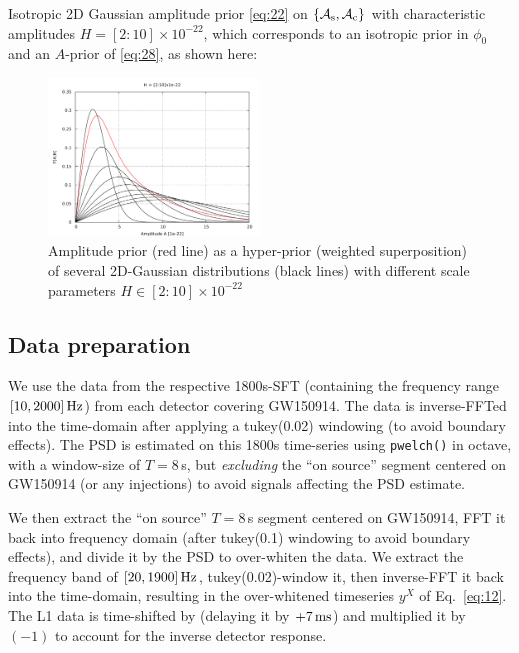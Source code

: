 \documentclass[aps,prd,onecolumn,notitlepage,nofootinbib,superscriptaddress,altaffilletter,floatfix]{revtex4-1}
\begin{document}
Isotropic 2D Gaussian amplitude prior \eqref{eq:22} on $\{{\mathcal A}_{\mathrm{s}},{\mathcal A}_{\mathrm{c}}\}$ with characteristic amplitudes $H = [2 : 10]\times10^{-22}$, which corresponds to
an isotropic prior in $\phi_0$ and an $A$-prior of \eqref{eq:28}, as shown here:
\begin{figure}[htbp]
  \centering
  \includegraphics[width=0.5\textwidth]{prior_A.pdf}
  \caption{Amplitude prior (red line) as a hyper-prior (weighted superposition) of several 2D-Gaussian distributions (black lines) with different
    scale parameters $H\in{[2:10]}\times10^{-22}$}
  \label{fig:AmpPrior}
\end{figure}

\subsection{Data preparation}
\label{sec:data-preparation}

We use the data from the respective 1800s-SFT (containing the frequency range $[10,2000]\,\mathrm{Hz}$) from each detector covering GW150914.
The data is inverse-FFTed into the time-domain after applying a tukey(0.02) windowing (to avoid boundary effects).
The PSD is estimated on this 1800s time-series using \texttt{pwelch()} in octave, with a window-size of $T=8\,$s, but \emph{excluding} the
``on source'' segment centered on GW150914 (or any injections) to avoid signals affecting the PSD estimate.

We then extract the ``on source'' $T=8\,$s segment centered on GW150914, FFT it back into frequency domain (after tukey(0.1) windowing to avoid
boundary effects),  and divide it by the PSD to over-whiten the data.
We extract the frequency band of $[20,1900]\,\mathrm{Hz}$, tukey(0.02)-window it, then inverse-FFT it back into the time-domain, resulting in the
over-whitened timeseries $y^X$ of Eq.~\eqref{eq:12}.
The L1 data is time-shifted by (delaying it by $+7\,\mathrm{ms}$) and multiplied it by $(-1)$ to account for the inverse detector response.
\end{document}
